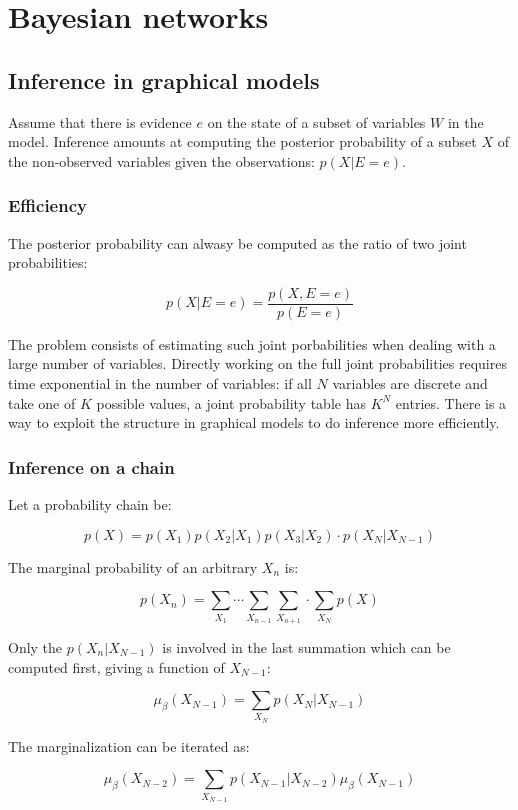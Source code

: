\chapter{Bayesian networks}

\section{Inference in graphical models}
Assume that there is evidence $e$ on the state of a subset of variables $W$ in the model.
Inference amounts at computing the posterior probability of a subset $X$ of the non-observed variables given the observations: $p(X|E=e)$.

	\subsection{Efficiency}
	The posterior probability can alwasy be computed as the ratio of two joint probabilities:

	$$p(X|E=e)=\frac{p(X,E=e)}{p(E=e)}$$

	The problem consists of estimating such joint porbabilities when dealing with a large number of variables.
	Directly working on the full joint probabilities requires time exponential in the number of variables: if all $N$ variables are discrete and take one of $K$ possible values, a joint probability table has $K^N$ entries.
	There is a way to exploit the structure in graphical models to do inference more efficiently.

	\subsection{Inference on a chain}
	Let a probability chain be:

	$$p(X) = p(X_1)p(X_2|X_1)p(X_3|X_2)\cdot p(X_N|X_{N-1})$$

	The marginal probability of an arbitrary $X_n$ is:

	$$p(X_n) = \sum\limits_{X_1}\cdots\sum\limits_{X_{n-1}}\sum\limits_{X_{n+1}}\cdot\sum\limits_{X_{N}}p(X)$$

	Only the $p(X_n|X_{N-1})$ is involved in the last summation which can be computed first, giving a function of $X_{N-1}$:

	$$\mu_\beta(X_{N-1}) = \sum\limits_{X_N}p(X_N|X_{N-1})$$

	The marginalization can be iterated as:

	$$\mu_\beta(X_{N-2}) = \sum\limits_{X_{N-1}}p(X_{N-1}|X_{N-2})\mu_\beta(X_{N-1})$$

